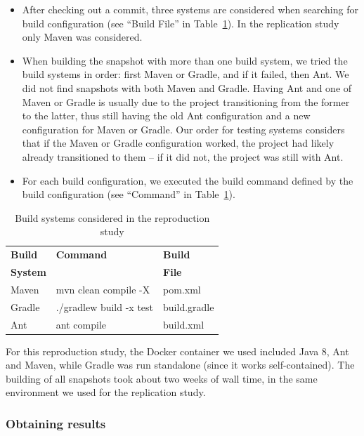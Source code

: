 \begin{itemize}
\item After checking out a commit, three systems are considered when searching for build configuration (see ``Build File'' in Table~\ref{table:buildSystems}). In the replication study only Maven was considered.
\item When building the snapshot with more than one build system, we tried the build systems in order: first Maven or Gradle, and if it failed, then Ant. We did not find snapshots with both Maven and Gradle. Having Ant and one of Maven or Gradle is usually due to the project transitioning from the former to the latter, thus still having the old Ant configuration and a new configuration for Maven or Gradle. Our order for testing systems considers that if the Maven or Gradle configuration worked, the project had likely already transitioned to them -- if it did not, the project was still with Ant.
\item For each build configuration, we executed the build command defined by the build configuration (see ``Command'' in Table~\ref{table:buildSystems}).
\end{itemize}

\begin{table}[h]
  \caption{Build systems considered in the reproduction study}
  \label{table:buildSystems}
  \centering
  \begin{tabular}{lll}
    \toprule
    \bf{Build } & \bf{Command} & \bf{Build}\\
    \bf{System} &              & \bf{File }\\ 
    \midrule
    Maven & mvn clean compile -X & pom.xml\\
    Gradle & ./gradlew build -x test & build.gradle \\
    Ant & ant compile  & build.xml \\
    \midrule
  \end{tabular}
\end{table}
 
For this reproduction study, the Docker container we used included Java 8, Ant and Maven, while Gradle was run standalone (since it works self-contained). 
The building of all snapshots took about two weeks of wall time, in the same environment we used for the replication study.


\subsubsection{Obtaining results}

